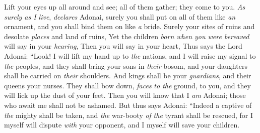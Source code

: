 \begin{biblechapter}
\verse Lift your eyes up all around and see; 
all of them gather; they come to you. 
\textit{As surely as I live}, 
\textit{declares} Adonai, 
surely you shall put on all of them like \textit{an} ornament, 
and you shall bind them on like \textit{a} bride.
\verse Surely your sites of ruins and desolate \textit{places} and land of ruins,
\verse Yet the children \textit{born when you were bereaved} will say in your \textit{hearing},
\verse Then you will say in your heart,
\verse Thus says the Lord Adonai:
\verse “Look! I will lift my hand up to \textit{the} nations, 
and I will raise my signal to \textit{the} peoples, 
and they shall bring your sons in \textit{their} bosom, 
and your daughters shall be carried on \textit{their} shoulders.
\verse And kings shall be your \textit{guardians}, 
and their queens your nurses. 
They shall bow down, \textit{faces} \textit{to the} ground, to you, 
and they will lick up the dust of your feet. 
Then you will know that I \textit{am} Adonai; 
those who await me shall not be ashamed.
\verse But thus says Adonai:
\verse “Indeed a captive of \textit{the} mighty shall be taken, 
and \textit{the} war-booty \textit{of} \textit{the} tyrant shall be rescued, 
for I myself will dispute \textit{with} your opponent, 
and I myself will save your children.
\end{biblechapter}

